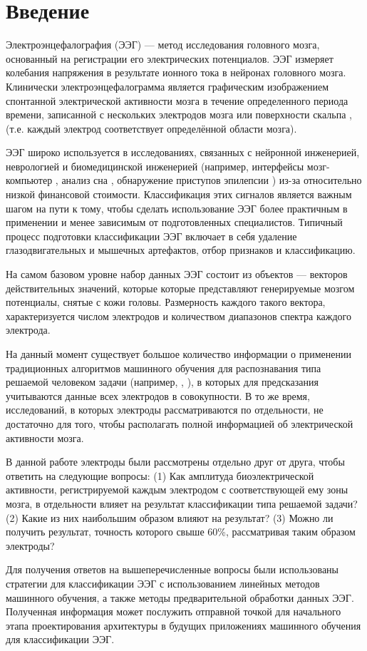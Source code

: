 
\vspace*{3mm}
\section{Введение}

\vspace*{7mm}
Электроэнцефалография (ЭЭГ) --- метод исследования головного мозга, основанный на
регистрации его электрических потенциалов. ЭЭГ измеряет колебания напряжения в
результате ионного тока в нейронах головного мозга. Клинически электроэнцефалограмма
является графическим изображением спонтанной электрической активности мозга в течение
определенного периода времени, записанной с нескольких электродов мозга или
поверхности скальпа \cite{EEG}, (т.е. каждый электрод соответствует определённой
области мозга).

ЭЭГ широко используется в исследованиях, связанных с нейронной инженерией, неврологией
и биомедицинской инженерией (например, интерфейсы мозг-компьютер \cite{EEG_app1},
анализ сна \cite{EEG_app2}, обнаружение приступов эпилепсии \cite{EEG_app3}) из-за
относительно низкой финансовой стоимости. Классификация этих сигналов является важным шагом на пути к тому, чтобы сделать
использование ЭЭГ более практичным в применении и менее зависимым от подготовленных
специалистов. Типичный процесс подготовки классификации ЭЭГ включает в себя удаление 
глазодвигательных и мышечных артефактов, отбор признаков и классификацию.

На самом базовом уровне набор данных ЭЭГ состоит из объектов --- векторов действительных
значений, которые которые представляют генерируемые мозгом потенциалы, снятые с кожи
головы. Размерность каждого такого вектора, характеризуется числом электродов и
количеством диапазонов спектра каждого электрода.

На данный момент существует большое количество информации о применении традиционных
алгоритмов машинного обучения для распознавания типа решаемой человеком задачи
(например, \cite{emotion_class1}, \cite{emotion_class2}), в которых для предсказания
учитываются данные всех электродов в совокупности. В то же время, исследований, в которых
электроды рассматриваются по отдельности, не достаточно для того, чтобы располагать полной
информацией об электрической активности мозга. 

\newpage
\vspace*{10mm}
В данной работе электроды были рассмотрены отдельно друг от друга, чтобы ответить на следующие
вопросы: (1) Как амплитуда биоэлектрической активности, регистрируемой каждым электродом
с соответствующей ему зоны мозга, в отдельности влияет на результат классификации типа
решаемой задачи? (2) Какие из них наибольшим образом влияют на результат? (3) Можно
ли получить результат, точность которого свыше 60\%, рассматривая таким образом электроды?

Для получения ответов на вышеперечисленные вопросы были использованы стратегии для классификации
ЭЭГ с использованием линейных методов машинного обучения, а также методы предварительной обработки
данных ЭЭГ. Полученная информация может послужить отправной точкой для начального этапа проектирования
архитектуры в будущих приложениях машинного обучения для классификации ЭЭГ. 